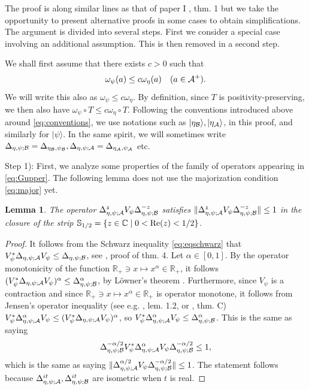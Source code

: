 \documentclass[english,a4paper,12pt]{article}
\newtheorem{lemma}{Lemma}
\def\bS{{\mathbb S}}
\def\cA{{\mathfrak A}}
\def\cB{{\mathfrak B}}
\newcommand{\ca}[1]{{\cal #1}}
\newcommand{\ben}{\begin{equation}}
\newcommand{\een}{\end{equation}}
\def\cA{{\ca A}}
\def\cB{{\ca B}}
\newcommand{\RR}{\mathbb{R}}
\newcommand{\CC}{\mathbb{C}}
\renewcommand{\Re}{{\rm Re}}
\begin{document}
The proof is along similar lines as that of paper I  \cite{Faulkner:2020iou}, thm. 1 but  we take the opportunity to present alternative proofs in some cases
to obtain simplifications. The argument is divided into several steps. First we consider a special case involving an additional assumption. This is then removed in a second step.

We shall first assume  that there 
exists $c>0$ such that 
\ben
\label{eq:major}
\omega_\psi(a) \le c\omega_\eta(a)  \quad (a \in \cA^+).
\een
We will write this also as $ \omega_\psi \le c\omega_\eta $. By definition, since $T$ is positivity-preserving, we then also have 
$\omega_\psi \circ T \le c\omega_\eta \circ T$. Following the conventions introduced above around \eqref{eq:conventions}, we use notations such as 
$|\eta_\cB\rangle, |\eta_\cA\rangle$, in this proof, and similarly for $|\psi\rangle$. In the same spirit, 
we will sometimes write $\Delta_{\eta,\psi;\cB}=\Delta_{\eta_\cB,\psi_\cB}, \Delta_{\eta,\psi;\cA}=\Delta_{\eta_\cA,\psi_\cA}$ etc.

\medskip

Step 1): First, we analyze some properties of the family of operators appearing in \eqref{eq:Gupper}.  The following lemma 
does not use the majorization condition \eqref{eq:major} yet.

\begin{lemma}\label{lem:1}
The operator $\Delta_{\eta,\psi;\cA}^{z} V_\psi \Delta_{\eta,\psi;\cB}^{-z}$ satisfies 
 $\|\Delta_{\eta,\psi;\cA}^{z} V_\psi \Delta_{\eta,\psi;\cB}^{-z}\| \le 1$ in the closure of the strip $\bS_{1/2}=\{z \in \CC \mid 0 < \Re (z) < 1/2\}$. 
\end{lemma}

\begin{proof}
It follows from the Schwarz inequality \eqref{eq:eqschwarz} that $V_\psi^* \Delta_{\eta,\psi;\cA} V_\psi \le \Delta_{\eta,\psi;\cB}$, see \cite{Petz4}, proof of thm. 4. Let $\alpha \in [0,1]$. By the operator monotonicity 
of the function $\RR_+ \owns x \mapsto x^\alpha \in \RR_+$, it follows  $(V_\psi^* \Delta_{\eta,\psi;\cA} V_\psi)^\alpha \le \Delta_{\eta,\psi;\cB}^\alpha$, by L\"owner's theorem \cite{Hansen}. Furthermore, since 
$V_\psi$ is a contraction and since $\RR_+ \owns x \mapsto x^\alpha \in \RR_+$ is operator monotone, it follows from Jensen's operator inequality 
(see e.g. \cite{Petz1993}, lem. 1.2, or \cite{Petz4}, thm. C) 
$V_\psi^* \Delta_{\eta,\psi;\cA}^\alpha V_\psi \le (V_\psi^* \Delta_{\eta,\psi;\cA} V_\psi)^\alpha$, so $V_\psi^* \Delta_{\eta,\psi;\cA}^\alpha V_\psi \le \Delta_{\eta,\psi;\cB}^\alpha$. This is the same as saying 
\ben
\Delta_{\eta,\psi;\cB}^{-\alpha/2} V_\psi^* \Delta_{\eta,\psi;\cA}^\alpha V_\psi \Delta_{\eta,\psi;\cB}^{-\alpha/2} \le 1, 
\een
which is the same as saying $\|\Delta_{\eta,\psi;\cA}^{\alpha/2} V_\psi \Delta_{\eta,\psi;\cB}^{-\alpha/2} \| \le 1$. The statement follows because $\Delta_{\eta,\psi;\cA}^{it}, \Delta_{\eta,\psi;\cB}^{it}$ are isometric 
when $t$ is real. 
\end{proof}
\end{document}
